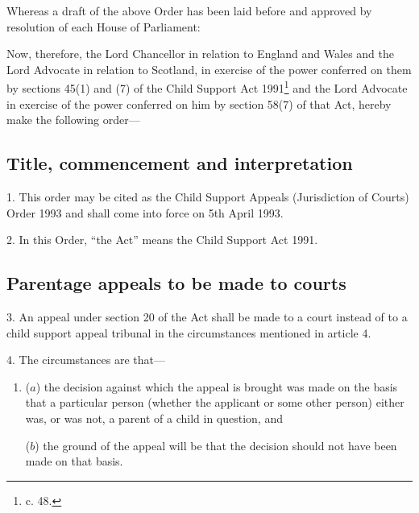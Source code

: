 \documentclass[12pt,a4paper]{article}
\title{\regstitle}
\author{S.I. 1993 No. 961 (L. 12)}
\date{Made 31st March 1993\\Coming into force 5th April 1993}
\begin{document}
\maketitle


\noindent
Whereas a draft of the above Order has been laid before and approved by resolution of each House of Parliament:

 Now, therefore, the Lord Chancellor in relation to England and Wales and the Lord Advocate in relation to Scotland, in exercise of the power conferred on them by sections 45(1) and (7) of the Child Support Act 1991\footnote{ c. 48.} and the Lord Advocate in exercise of the power conferred on him by section 58(7) of that Act, hereby make the following order—

{\sloppy

\tableofcontents

}

\setcounter{secnumdepth}{-2}

\subsection[1, 2. Title, commencement and interpretation]{Title, commencement and interpretation}

1.  This order may be cited as the Child Support Appeals (Jurisdiction of Courts) Order 1993 and shall come into force on 5th April 1993.

\medskip

2.  In this Order, “the Act” means the Child Support Act 1991.

\subsection[3--5. Parentage appeals to be made to courts]{Parentage appeals to be made to courts}

3.  An appeal under section 20 of the Act shall be made to a court instead of to a child support appeal tribunal in the circumstances mentioned in article 4.

\medskip

4.  The circumstances are that—
\begin{enumerate}\item[]
($a$) the decision against which the appeal is brought was made on the basis that a particular person (whether the applicant or some other person) either was, or was not, a parent of a child in question, and

($b$) the ground of the appeal will be that the decision should not have been made on that basis.
\end{enumerate}
\end{document}
